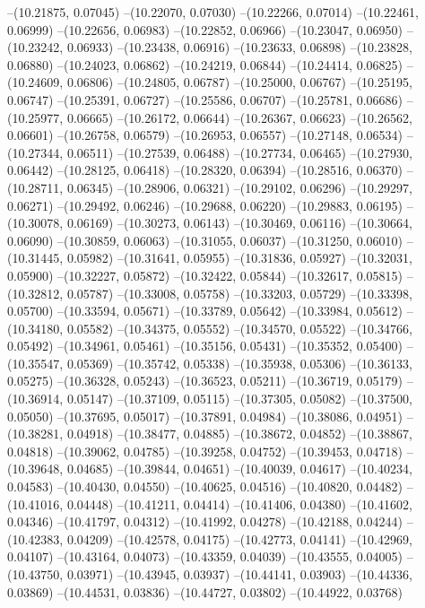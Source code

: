 --(10.21875, 0.07045)
--(10.22070, 0.07030)
--(10.22266, 0.07014)
--(10.22461, 0.06999)
--(10.22656, 0.06983)
--(10.22852, 0.06966)
--(10.23047, 0.06950)
--(10.23242, 0.06933)
--(10.23438, 0.06916)
--(10.23633, 0.06898)
--(10.23828, 0.06880)
--(10.24023, 0.06862)
--(10.24219, 0.06844)
--(10.24414, 0.06825)
--(10.24609, 0.06806)
--(10.24805, 0.06787)
--(10.25000, 0.06767)
--(10.25195, 0.06747)
--(10.25391, 0.06727)
--(10.25586, 0.06707)
--(10.25781, 0.06686)
--(10.25977, 0.06665)
--(10.26172, 0.06644)
--(10.26367, 0.06623)
--(10.26562, 0.06601)
--(10.26758, 0.06579)
--(10.26953, 0.06557)
--(10.27148, 0.06534)
--(10.27344, 0.06511)
--(10.27539, 0.06488)
--(10.27734, 0.06465)
--(10.27930, 0.06442)
--(10.28125, 0.06418)
--(10.28320, 0.06394)
--(10.28516, 0.06370)
--(10.28711, 0.06345)
--(10.28906, 0.06321)
--(10.29102, 0.06296)
--(10.29297, 0.06271)
--(10.29492, 0.06246)
--(10.29688, 0.06220)
--(10.29883, 0.06195)
--(10.30078, 0.06169)
--(10.30273, 0.06143)
--(10.30469, 0.06116)
--(10.30664, 0.06090)
--(10.30859, 0.06063)
--(10.31055, 0.06037)
--(10.31250, 0.06010)
--(10.31445, 0.05982)
--(10.31641, 0.05955)
--(10.31836, 0.05927)
--(10.32031, 0.05900)
--(10.32227, 0.05872)
--(10.32422, 0.05844)
--(10.32617, 0.05815)
--(10.32812, 0.05787)
--(10.33008, 0.05758)
--(10.33203, 0.05729)
--(10.33398, 0.05700)
--(10.33594, 0.05671)
--(10.33789, 0.05642)
--(10.33984, 0.05612)
--(10.34180, 0.05582)
--(10.34375, 0.05552)
--(10.34570, 0.05522)
--(10.34766, 0.05492)
--(10.34961, 0.05461)
--(10.35156, 0.05431)
--(10.35352, 0.05400)
--(10.35547, 0.05369)
--(10.35742, 0.05338)
--(10.35938, 0.05306)
--(10.36133, 0.05275)
--(10.36328, 0.05243)
--(10.36523, 0.05211)
--(10.36719, 0.05179)
--(10.36914, 0.05147)
--(10.37109, 0.05115)
--(10.37305, 0.05082)
--(10.37500, 0.05050)
--(10.37695, 0.05017)
--(10.37891, 0.04984)
--(10.38086, 0.04951)
--(10.38281, 0.04918)
--(10.38477, 0.04885)
--(10.38672, 0.04852)
--(10.38867, 0.04818)
--(10.39062, 0.04785)
--(10.39258, 0.04752)
--(10.39453, 0.04718)
--(10.39648, 0.04685)
--(10.39844, 0.04651)
--(10.40039, 0.04617)
--(10.40234, 0.04583)
--(10.40430, 0.04550)
--(10.40625, 0.04516)
--(10.40820, 0.04482)
--(10.41016, 0.04448)
--(10.41211, 0.04414)
--(10.41406, 0.04380)
--(10.41602, 0.04346)
--(10.41797, 0.04312)
--(10.41992, 0.04278)
--(10.42188, 0.04244)
--(10.42383, 0.04209)
--(10.42578, 0.04175)
--(10.42773, 0.04141)
--(10.42969, 0.04107)
--(10.43164, 0.04073)
--(10.43359, 0.04039)
--(10.43555, 0.04005)
--(10.43750, 0.03971)
--(10.43945, 0.03937)
--(10.44141, 0.03903)
--(10.44336, 0.03869)
--(10.44531, 0.03836)
--(10.44727, 0.03802)
--(10.44922, 0.03768)
